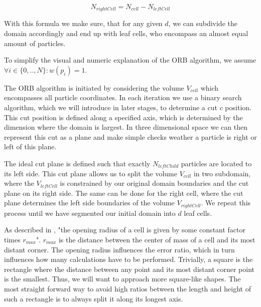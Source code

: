 \documentclass[]{article}
\begin{document}
\begin{center}
	\begin{equation}
		N_{rightCell} = N_{cell} - N_{leftCell}
	\end{equation}
\end{center}

With this formula we make sure, that for any given $d$, we can subdivide the domain accordingly and end up with leaf cells, who encompass an almost equal amount of particles. 


To simplify the visual and numeric explanation of the ORB algorithm, we assume $\forall i \in \{0,..,N\} : w(p_i) = 1$.

The ORB algorithm is initiated by considering the volume $V_{cell}$ which encompasses all particle coordinates. In each iteration we use a binary search algorithm, which we will introduce in later stages, to determine a cut $c$ position. This cut position is defined along a specified axis, which is determined by the dimension where the domain is largest. In three dimensional space we can then represent this cut as a plane and make simple checks weather a particle is right or left of this plane. 

The ideal cut plane is defined such that exactly $N_{leftChild}$ particles are located to its left side. This cut plane allows us to split the volume $V_{cell}$ in two subdomain, where the $V_{leftCell}$ is constrained by our original domain boundaries and the cut plane on its right side. The same can be done for the right cell, where the cut plane determines the left side boundaries of the volume $V_{rightCell}$. We repeat this process until we have segmented our initial domain into $d$ leaf cells.

As described in \cite{Stadel2001}, "the opening radius of a cell is given by some constant factor times $r_{max}$". $r_{max}$ is the distance between the center of mass of a cell and its most distant corner. The opening radius influences the error ratio, which in turn influences how many calculations have to be performed. Trivially, a square is the rectangle where the distance between any point and its most distant corner point is the smallest. Thus, we will want to approach more square-like shapes.
The most straight forward way to avoid high ratios between the length and height of such a rectangle is to always split it along its longest axis.
\end{document}
